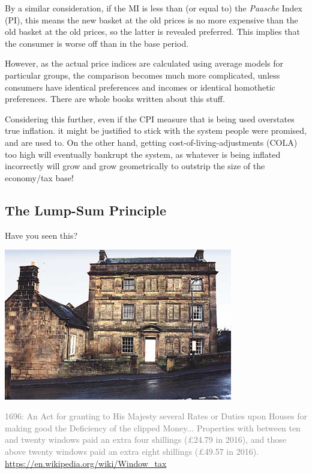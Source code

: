 \documentclass[]{article}
\begin{document}
By a similar consideration, if the MI is less than (or equal to) the \emph{Paasche} Index (PI), this means the new basket at the old prices is no more expensive than the old basket at the old prices, so the latter is revealed preferred. This implies that the consumer is worse off than in the base period.

However, as the actual price indices are calculated using average models for particular groups, the comparison becomes much more complicated, unless consumers have identical preferences and incomes or identical homothetic preferences. There are whole books written about this stuff.

Considering this further, even if the CPI measure that is being used overstates true inflation. it might be justified to stick with the system people were promised, and are used to. On the other hand, getting cost-of-living-adjustments (COLA) too high will eventually bankrupt the system, as whatever is being inflated incorrectly will grow and grow geometrically to outstrip the size of the economy/tax base!

\hypertarget{the-lump-sum-principle}{%
\subsection{The Lump-Sum Principle}\label{the-lump-sum-principle}}

Have you seen this?

\includegraphics[height=2.6in]{picsfigs/ukwindows.jpg}

\textcolor{gray}{1696: An Act for granting to His Majesty several Rates or Duties upon Houses for making good the Deficiency of the clipped Money...
Properties with between ten and twenty windows paid an extra four shillings (£24.79 in 2016), and those above twenty windows paid an extra eight shillings (£49.57 in 2016).} \url{https://en.wikipedia.org/wiki/Window_tax}
\end{document}
